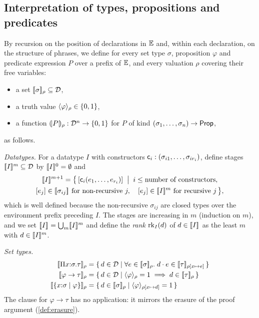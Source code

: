 \subsection{Interpretation of types, propositions and predicates}
\label{sec:semantics-interp}

\begin{definition}[Interpretations]
\label{def:interp}
By recursion on the position of declarations in $\mathbb{E}$ and, within each
declaration, on the structure of phrases, we define for every set type
$\sigma$, proposition $\varphi$ and predicate expression $P$ over a prefix
of $\mathbb{E}$, and every valuation $\rho$ covering their free variables:
\begin{itemize}[leftmargin=2em]
\item a set $[\![ \sigma ]\!]_{\rho} \subseteq \mathcal{D}$,
\item a truth value $\langle \varphi \rangle_{\rho} \in \{0, 1\}$,
\item a function $(\!| P |\!)_{\rho} : \mathcal{D}^n \to \{0,1\}$ for $P$ of kind
  $(\sigma_1, \dots, \sigma_n) \to \mathsf{Prop}$,
\end{itemize}
as follows.

\emph{Datatypes.}  For a datatype $I$ with constructors $\mathsf{c}_i :
(\sigma_{i1}, \dots, \sigma_{ir_i})$, define stages $[\![ I ]\!]^{m}
\subseteq \mathcal{D}$ by $[\![ I ]\!]^{0} = \emptyset$ and
\begin{multline*}
  \stage{I}{m+1} = \bigl\{\, \cls{\wcns{c}_i(e_1, \dots, e_{r_i})} \;\bigm|\;
    i \leq \text{number of constructors},\\
    \cls{e_j} \in \semr{\sigma_{ij}}{} \text{ for non-recursive } j,\quad
    \cls{e_j} \in \stage{I}{m} \text{ for recursive } j \,\bigr\},
\end{multline*}
which is well defined because the non-recursive $\sigma_{ij}$ are closed
types over the environment prefix preceding $I$.  The stages are
increasing in $m$ (induction on $m$), and we set $[\![ I ]\!]_{} =
\bigcup_{m} [\![ I ]\!]^{m}$ and define the \emph{rank}
$\mathrm{rk}_{I}(d)$ of $d \in [\![ I ]\!]_{}$ as the least $m$ with $d \in
[\![ I ]\!]^{m}$.

\emph{Set types.}
\begin{align*}
  \semr{\Pi x{:}\sigma.\tau}{\rho} &=
    \{\, d \in \Dom \mid \forall e \in \semr{\sigma}{\rho}.\;
      d \cdot e \in \semr{\tau}{\rho[x \mapsto e]} \,\}\\
  \semr{\varphi \to \tau}{\rho} &=
    \{\, d \in \Dom \mid \pvr{\varphi}{\rho} = 1 \implies d \in
      \semr{\tau}{\rho} \,\}\\
  \semr{\refty{x{:}\sigma}{\varphi}}{\rho} &=
    \{\, d \in \semr{\sigma}{\rho} \mid \pvr{\varphi}{\rho[x \mapsto d]}
      = 1 \,\}
\end{align*}
The clause for $\varphi \to \tau$ has no application: it mirrors the
erasure of the proof argument (\cref{def:erasure}).


\end{definition}
